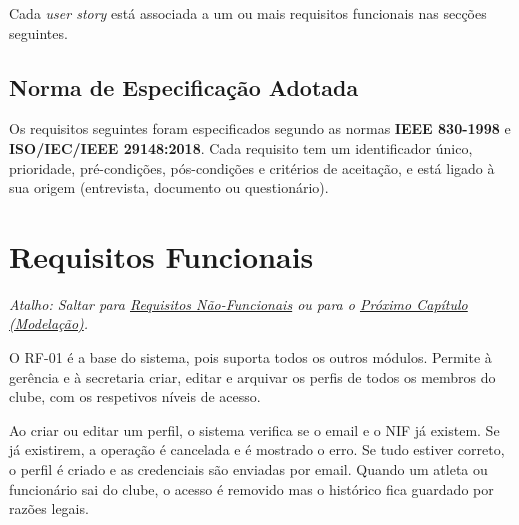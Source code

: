 Cada \textit{user story} está associada a um ou mais requisitos funcionais nas secções seguintes.

\subsection{Norma de Especificação Adotada}

Os requisitos seguintes foram especificados segundo as normas \textbf{IEEE 830-1998} e \textbf{ISO/IEC/IEEE 29148:2018}. Cada requisito tem um identificador único, prioridade, pré-condições, pós-condições e critérios de aceitação, e está ligado à sua origem (entrevista, documento ou questionário).

\section{Requisitos Funcionais}\label{sec:requisitos_funcionais}

\noindent\textit{Atalho: Saltar para \hyperref[sec:requisitos_nao_funcionais]{Requisitos Não-Funcionais} ou para o \hyperref[chap:especificacao_modelacao]{Próximo Capítulo (Modelação)}.}\par\medskip

O RF-01 é a base do sistema, pois suporta todos os outros módulos. Permite à gerência e à secretaria criar, editar e arquivar os perfis de todos os membros do clube, com os respetivos níveis de acesso.

Ao criar ou editar um perfil, o sistema verifica se o email e o NIF já existem. Se já existirem, a operação é cancelada e é mostrado o erro. Se tudo estiver correto, o perfil é criado e as credenciais são enviadas por email. Quando um atleta ou funcionário sai do clube, o acesso é removido mas o histórico fica guardado por razões legais.

